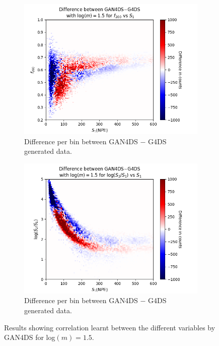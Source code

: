 \documentclass[11pt]{article} %
\begin{document}
\begin{figure}[H]
\begin{minipage}{\textwidth}
\end{minipage}
\begin{minipage}{\textwidth}
  \begin{subfigure}{.5\textwidth}
      \centering\captionsetup{width=.9\linewidth}%
      \includegraphics[scale=0.6]{./images/1.5/difference_f200_vs_s1.png}
      \caption{Difference per bin between GAN4DS $-$ G4DS generated data.}
  \end{subfigure}
  \begin{subfigure}{.5\textwidth}
      \centering\captionsetup{width=.9\linewidth}%
      \includegraphics[scale=0.6]{./images/1.5/difference_s1_over_s2_vs_s1.png}
      \caption{Difference per bin between GAN4DS $-$ G4DS generated data.}
  \end{subfigure}
\end{minipage}
\caption{Results showing correlation learnt between the different variables by GAN4DS for log$(m)=1.5$.}
\label{fig:corr_results_1_5}
\end{figure}
\end{document}
